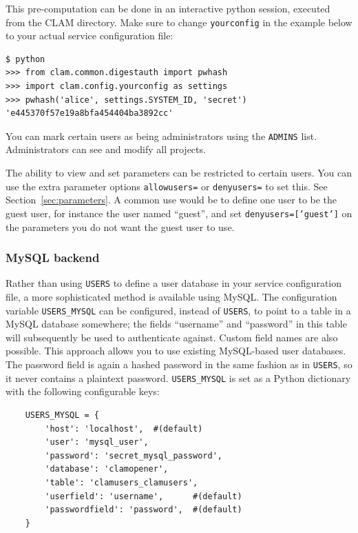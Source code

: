 \documentclass[a4paper,12pt,twoside,openright]{report}
\begin{document}
This pre-computation can be done in an interactive python session, executed from
the CLAM directory. Make sure to change \texttt{yourconfig} in the
example below to your actual service configuration file:

{ \small
\begin{verbatim}
$ python
>>> from clam.common.digestauth import pwhash
>>> import clam.config.yourconfig as settings
>>> pwhash('alice', settings.SYSTEM_ID, 'secret')
'e445370f57e19a8bfa454404ba3892cc'
\end{verbatim}
}

You can mark certain users as being administrators using the \texttt{ADMINS}
list. Administrators can see and modify all projects.


The ability to view and set parameters can be restricted to certain users. You
can use the extra parameter options \texttt{allowusers=} or \texttt{denyusers=}
to set this. See Section~\ref{sec:parameters}. A common use would be to define
one user to be the guest user, for instance the user named ``guest'', and set
\texttt{denyusers=['guest']} on the parameters you do not want the guest user
to use.

\subsubsection{MySQL backend}

Rather than using \texttt{USERS} to define a user database in your service
configuration file, a more sophisticated method is available using MySQL. The
configuration variable \texttt{USERS\_MYSQL} can be configured, instead of
\texttt{USERS}, to point to a table in a MySQL database somewhere; the fields
``username'' and ``password'' in this table will subsequently be used to
authenticate against. Custom field names are also possible. This approach
allows you to use existing MySQL-based user databases. The password field is
again a hashed password in the same fashion as in \texttt{USERS}, so it never
contains a plaintext password. \texttt{USERS\_MYSQL} is set as a Python
dictionary with the following configurable keys:

{ \small
\begin{verbatim}
    USERS_MYSQL = {
        'host': 'localhost',  #(default)
        'user': 'mysql_user',        
        'password': 'secret_mysql_password',
        'database': 'clamopener',
        'table': 'clamusers_clamusers',
        'userfield': 'username',      #(default)
        'passwordfield': 'password',  #(default)
    }
\end{verbatim}
}
\end{document}

